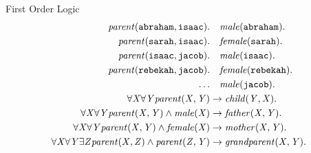 \documentclass[presentation]{beamer}\mode<presentation>{\usetheme{AMSBolognaFC}}
\begin{document}
\begin{frame}[allowframebreaks]{First Order Logic}
    \begin{equation*}
        \begin{aligned}
            \mathit{parent}(\mathtt{abraham},\mathtt{isaac}). &\phantom{\rightarrow} \mathit{male}(\mathtt{abraham}).\\
            \mathit{parent}(\mathtt{sarah},\mathtt{isaac}). &\phantom{\rightarrow} \mathit{female}(\mathtt{sarah}).\\
            \mathit{parent}(\mathtt{isaac},\mathtt{jacob}). &\phantom{\rightarrow} \mathit{male}(\mathtt{isaac}).\\
            \mathit{parent}(\mathtt{rebekah},\mathtt{jacob}). &\phantom{\rightarrow} \mathit{female}(\mathtt{rebekah}).\\
            \dots &\phantom{\rightarrow} \mathit{male}(\mathtt{jacob}).\\
            \forall\mathit{X} \forall\mathit{Y} \mathit{parent}(\mathtt{\mathit{X}},\mathit{Y}) &\rightarrow \mathit{child}(\mathit{Y},\mathit{X}).\\
            \forall\mathit{X} \forall\mathit{Y} \mathit{parent}(\mathtt{\mathit{X}},\mathit{Y}) \wedge \mathit{male}(\mathit{X}) &\rightarrow \mathit{father}(\mathit{X},\mathit{Y}).\\
            \forall\mathit{X} \forall\mathit{Y} \mathit{parent}(\mathtt{\mathit{X}},\mathit{Y}) \wedge \mathit{female}(\mathit{X}) &\rightarrow \mathit{mother}(\mathit{X},\mathit{Y}).\\
            \forall\mathit{X} \forall\mathit{Y} \exists\mathit{Z} \mathit{parent}(\mathtt{\mathit{X}},\mathit{Z}) \wedge \mathit{parent}(\mathit{Z},\mathit{Y}) &\rightarrow \mathit{grandparent}(\mathit{X},\mathit{Y}).\\
        \end{aligned}    
    \end{equation*}
\end{frame}
\end{document}
